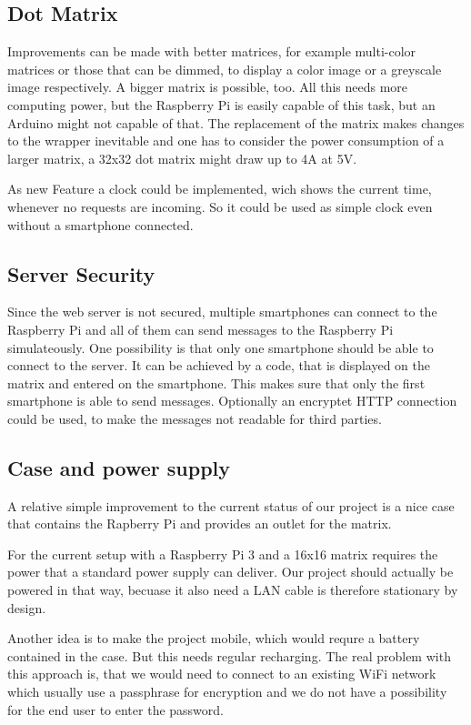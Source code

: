 \documentclass[conference]{IEEEtran}
\begin{document}
\subsection{Dot Matrix}
Improvements can be made with better matrices, for example multi-color matrices or those that can be dimmed, to display a color image or a greyscale image respectively. A bigger matrix is possible, too. All this needs more computing power, but the Raspberry Pi is easily capable of this task, but an Arduino might not capable of that. The replacement of the matrix makes changes to the wrapper inevitable and one has to consider the power consumption of a larger matrix, a 32x32 dot matrix might draw up to 4A at 5V.

As new Feature a clock could be implemented, wich shows the current time, whenever no requests are incoming. So it could be used as simple clock even without a smartphone connected.

\subsection{Server Security}
Since the web server is not secured, multiple smartphones can connect to the Raspberry Pi and all of them can send messages to the Raspberry Pi simulateously. One possibility is that only one smartphone should be able to connect to the server. It can be achieved by a code, that is displayed on the matrix and entered on the smartphone. This makes sure that only the first smartphone is able to send messages. Optionally an encryptet HTTP connection could be used, to make the messages not readable for third parties.

\subsection{Case and power supply}
A relative simple improvement to the current status of our project is a nice case that contains the Rapberry Pi and provides an outlet for the matrix.

For the current setup with a Raspberry Pi 3 and a 16x16 matrix requires the power that a standard power supply can deliver. Our project should actually be powered in that way, becuase it also need a LAN cable is therefore stationary by design.

Another idea is to make the project mobile, which would requre a battery contained in the case. But this needs regular recharging. The real problem with this approach is, that we would need to connect to an existing WiFi network which usually use a passphrase for encryption and we do not have a possibility for the end user to enter the password.
\end{document}
